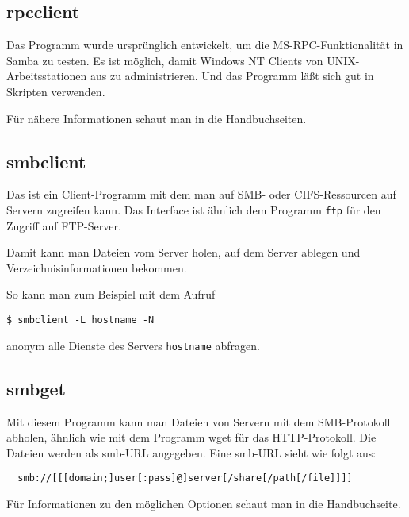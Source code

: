 \begin{normaltext}
  \subsection*{rpcclient}
  Das Programm wurde ursprünglich entwickelt, um die MS-RPC-Funktionalität in
  Samba zu testen. Es ist möglich, damit Windows NT Clients von
  UNIX-Arbeitsstationen aus zu administrieren. Und das Programm läßt sich gut
  in Skripten verwenden.
  
  Für nähere Informationen schaut man in die Handbuchseiten.

  \subsection*{smbclient}
  Das ist ein Client-Programm mit dem man auf SMB- oder CIFS-Ressourcen auf
  Servern zugreifen kann. Das Interface ist ähnlich dem Programm \verb?ftp?
  für den Zugriff auf FTP-Server.

  Damit kann man Dateien vom Server holen, auf dem Server ablegen und
  Verzeichnisinformationen bekommen.

  So kann man zum Beispiel mit dem Aufruf
  \begin{verbatim}
$ smbclient -L hostname -N
  \end{verbatim}
  anonym alle Dienste des Servers \verb?hostname? abfragen.
  
  \subsection*{smbget}
  Mit diesem  Programm kann man Dateien von Servern mit dem SMB-Protokoll
  abholen, ähnlich wie mit dem Programm wget für das HTTP-Protokoll. Die
  Dateien werden als smb-URL angegeben. Eine smb-URL sieht wie folgt aus:
  \begin{verbatim}
  smb://[[[domain;]user[:pass]@]server[/share[/path[/file]]]]
  \end{verbatim}
  Für Informationen zu den möglichen Optionen schaut man in die Handbuchseite.


\end{normaltext}
